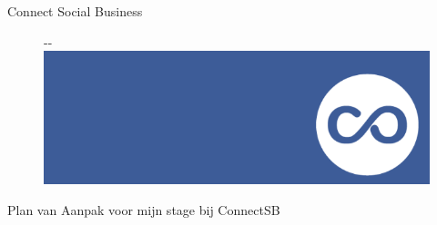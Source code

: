 \pagestyle{fancy}
\fancyhf{}
\lfoot{\thepage}


\begin{center}

{\Huge Connect Social Business\par}
\begin{figure}[!ht]
\begin{adjustwidth}{-\oddsidemargin-1in}{-\rightmargin}
\centering
\includegraphics[width=\paperwidth]{connectsblogo}
\end{adjustwidth}
\end{figure}

Plan van Aanpak voor mijn stage bij ConnectSB

\end{center}
\thispagestyle{empty}
\clearpage

